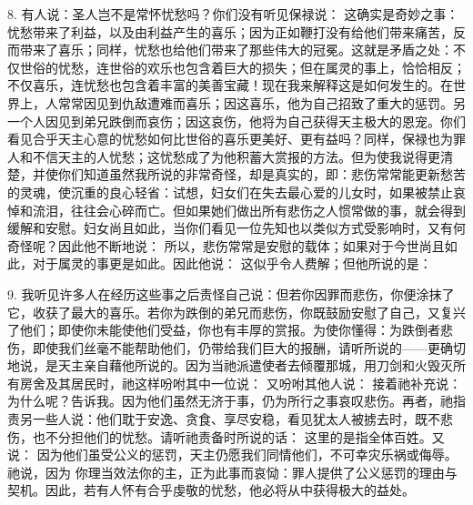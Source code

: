 8. 有人说：圣人岂不是常怀忧愁吗？你们没有听见保禄说： 这确实是奇妙之事：忧愁带来了利益，以及由利益产生的喜乐；因为正如鞭打没有给他们带来痛苦，反而带来了喜乐；同样，忧愁也给他们带来了那些伟大的冠冕。这就是矛盾之处：不仅世俗的忧愁，连世俗的欢乐也包含着巨大的损失；但在属灵的事上，恰恰相反；不仅喜乐，连忧愁也包含着丰富的美善宝藏！现在我来解释这是如何发生的。在世界上，人常常因见到仇敌遭难而喜乐；因这喜乐，他为自己招致了重大的惩罚。另一个人因见到弟兄跌倒而哀伤；因这哀伤，他将为自己获得天主极大的恩宠。你们看见合乎天主心意的忧愁如何比世俗的喜乐更美好、更有益吗？同样，保禄也为罪人和不信天主的人忧愁；这忧愁成了为他积蓄大赏报的方法。但为使我说得更清楚，并使你们知道虽然我所说的非常奇怪，却是真实的，即：悲伤常常能更新愁苦的灵魂，使沉重的良心轻省：试想，妇女们在失去最心爱的儿女时，如果被禁止哀悼和流泪，往往会心碎而亡。但如果她们做出所有悲伤之人惯常做的事，就会得到缓解和安慰。妇女尚且如此，当你们看见一位先知也以类似方式受影响时，又有何奇怪呢？因此他不断地说： 所以，悲伤常常是安慰的载体；如果对于今世尚且如此，对于属灵的事更是如此。因此他说： 这似乎令人费解；但他所说的是：\par

9. 我听见许多人在经历这些事之后责怪自己说：但若你因罪而悲伤，你便涂抹了它，收获了最大的喜乐。若你为跌倒的弟兄而悲伤，你既鼓励安慰了自己，又复兴了他们；即使你未能使他们受益，你也有丰厚的赏报。为使你懂得：为跌倒者悲伤，即使我们丝毫不能帮助他们，仍带给我们巨大的报酬，请听所说的——更确切地说，是天主亲自藉他所说的。因为当祂派遣使者去倾覆那城，用刀剑和火毁灭所有房舍及其居民时，祂这样吩咐其中一位说： 又吩咐其他人说： 接着祂补充说：  为什么呢？告诉我。因为他们虽然无济于事，仍为所行之事哀叹悲伤。再者，祂指责另一些人说：他们耽于安逸、贪食、享尽安稳，看见犹太人被掳去时，既不悲伤，也不分担他们的忧愁。请听祂责备时所说的话：  这里的是指全体百姓。又说： 因为他们虽受公义的惩罚，天主仍愿我们同情他们，不可幸灾乐祸或侮辱。祂说，因为  你理当效法你的主，正为此事而哀恸：罪人提供了公义惩罚的理由与契机。因此，若有人怀有合乎虔敬的忧愁，他必将从中获得极大的益处。\par

